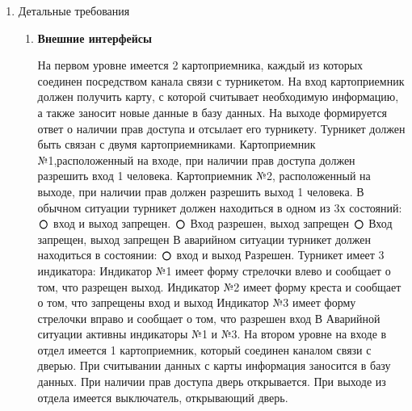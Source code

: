 \documentclass[12pt]{article} %
\def\circmark{\mathbin{\scalerel*{\circ}{j}}}
\begin{document}
\begin{enumerate}
\begin{enumerate}
  	\end{enumerate}
  \item Детальные требования
  	\begin{enumerate}
  		\item \begin{large} \textbf{Внешние интерфейсы} \end{large} \newline
  		  На первом уровне имеется 2 картоприемника, каждый из которых соединен посредством канала связи с турникетом.
  		  На вход картоприемник должен получить карту, с которой считывает необходимую информацию, а также заносит новые данные в базу данных. На выходе формируется ответ о наличии прав доступа и отсылает его турникету. Турникет должен быть связан с двумя картоприемниками. Картоприемник №1,расположенный на входе, при наличии прав доступа должен разрешить вход 1 человека. Картоприемник №2, расположенный на выходе, при наличии прав должен разрешить выход 1 человека.
  		     В обычном ситуации турникет должен находиться в одном из 3х состояний: \newline
    		  $\circmark $  вход и выход запрещен. \newline
    		  $\circmark $ Вход разрешен, выход запрещен\newline
  	    	  $\circmark $ Вход запрещен, выход запрещен\newline
  		     В аварийном ситуации турникет должен находиться в состоянии:\newline
  		      $\circmark $  вход и выход Разрешен. \newline
  		  Турникет имеет 3 индикатора: \newline
  		  Индикатор №1 имеет форму стрелочки влево и сообщает о том, что разрещен выход.\newline
  		  Индикатор №2 имеет форму креста и сообщает о том, что запрещены вход и выход\newline
  		  Индикатор №3 имеет форму стрелочки вправо и сообщает о том, что разрешен вход\newline
  		  В Аварийной ситуации активны индикаторы №1 и №3.\newline
  		  На втором уровне на входе в отдел имеется 1 картоприемник, который соединен каналом связи с дверью. При считывании данных с карты информация заносится в базу данных. При наличии прав доступа дверь открывается. При выходе из отдела имеется выключатель, открывающий дверь.
  		    

\end{enumerate}
\end{enumerate}
\end{document}
